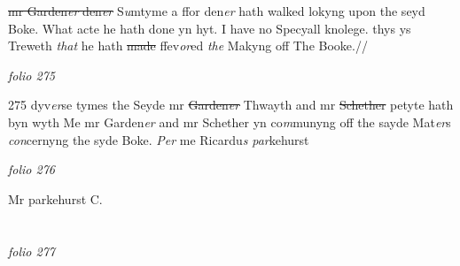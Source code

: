 \documentclass[12pt, a4paper]{book}
\begin{document}
               \sout{mr Garden\textit{er} den\textit{er}
               }
               \textit{} S\textit{u}mtyme a ffor den\textit{er} hath walked lokyng upon the seyd Boke. What acte he hath done yn hyt. I have no Specyall knolege. thys ys Treweth \textit{that} he hath \sout{made }ffev\textit{or}ed \textit{the} Makyng off  The Booke.//              

\dotfill
					

\textit{folio 275}


{\color{Mahogany}275} dyv\textit{er}se tymes the Seyde mr \sout{Garden\textit{er}
               }
               Thwayth 
			and mr \sout{Schether }
               petyte 
			hath byn wyth Me mr Garden\textit{er} and mr Schether yn co\textit{m}munyng off the sayde Mat\textit{er}s \textit{con}cernyng the syde Boke.  \textit{Per} me Ricardu\textit{s}
               \textit{par}kehurst

\dotfill
					

\textit{folio 276}


Mr parkehurst C.

\dotfill
					  \section*{}  \subsection*{}

\textit{folio 277}
\end{document}
